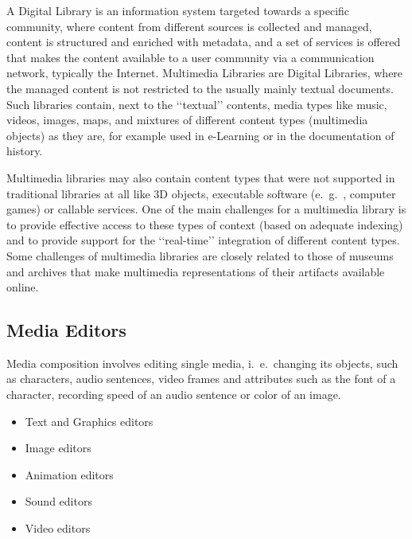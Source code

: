  
 A Digital Library is an information system targeted towards a specific community, where content from different sources is collected and managed, content is structured and enriched with metadata, and a set of services is offered that makes the content available to a user community via a communication network, typically the Internet. Multimedia Libraries are Digital Libraries, where the managed content is not restricted to the usually mainly textual documents. Such libraries contain, next to the ‘‘textual’’ contents, media types like music, videos, images, maps, and mixtures of different content types (multimedia objects) as they are, for example used in e-Learning or in the documentation of history. 
 
 Multimedia libraries may also contain content types that were not supported in traditional libraries at all like 3D objects, executable software (e.\ g.\ , computer games) or callable services. One of the main challenges for a multimedia library is to provide effective access to these types of context (based on adequate indexing) and to provide support for the ‘‘real-time’’ integration of different content types. Some challenges of multimedia libraries are closely related to those of museums and archives that make multimedia representations of their artifacts available online.
 
 


 
\subsection{Media Editors}
Media composition involves editing single media, i.\ e.\, changing its objects, such as characters, audio sentences, video frames and attributes such as the font of a
character, recording speed of an audio sentence or color of an image.

\begin{itemize}
	\item Text and Graphics editors
	\item Image editors
	\item Animation editors
	\item Sound editors
	\item Video editors
\end{itemize}

